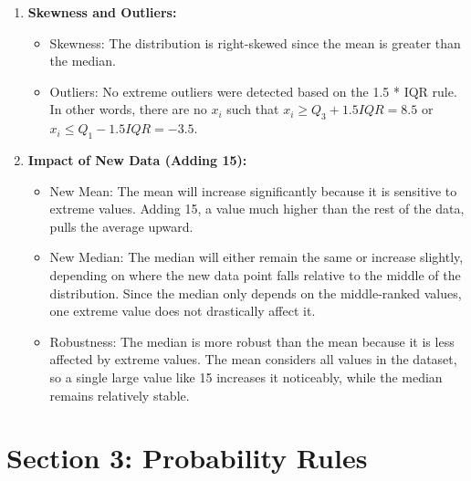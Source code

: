 \documentclass{article}
\begin{document}
\begin{enumerate}
\begin{itemize}
\end{itemize}

\item \textbf{Skewness and Outliers:}  
\begin{itemize}
    \item Skewness: The distribution is right-skewed since the mean is greater than the median.
    \item Outliers: No extreme outliers were detected based on the 1.5 * IQR rule. In other words, there are no $x_i$ such that $x_i\geq Q_3+1.5IQR = 8.5$ or $x_i\leq Q_1 - 1.5IQR = -3.5$.
\end{itemize}

\item \textbf{Impact of New Data (Adding 15):}  
\begin{itemize}
    \item New Mean: The mean will increase significantly because it is sensitive to extreme values. Adding 15, a value much higher than the rest of the data, pulls the average upward.
    \item New Median: The median will either remain the same or increase slightly, depending on where the new data point falls relative to the middle of the distribution. Since the median only depends on the middle-ranked values, one extreme value does not drastically affect it.
    \item Robustness: The median is more robust than the mean because it is less affected by extreme values. The mean considers all values in the dataset, so a single large value like 15 increases it noticeably, while the median remains relatively stable.
\end{itemize}

\end{enumerate}

\section*{Section 3: Probability Rules}
\end{document}
